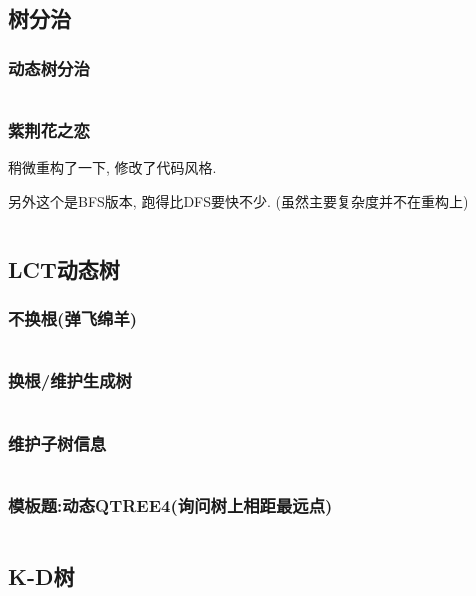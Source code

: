 \documentclass[a4paper, twoside]{article}
\begin{document}
\begin{multicols}{2}
			\subsection{树分治}

				
				\subsubsection{动态树分治}
					\inputminted{cpp}{../src/datastructure/动态树分治.cpp}

				\subsubsection{紫荆花之恋}
					稍微重构了一下, 修改了代码风格.

					另外这个是BFS版本, 跑得比DFS要快不少. (虽然主要复杂度并不在重构上)
					\inputminted{cpp}{../src/datastructure/紫荆花之恋.cpp}
	
			\subsection{LCT动态树}
				\subsubsection{不换根(弹飞绵羊)}
					\inputminted{cpp}{../src/datastructure/LCT(不换根).cpp}
			
				\subsubsection{换根/维护生成树}
					\inputminted{cpp}{../src/datastructure/LCT(换根).cpp}

				\subsubsection{维护子树信息}
					\inputminted{cpp}{../src/datastructure/LCT维护子树信息.cpp}
					
				\subsubsection[模板题:动态QTREE4]{模板题:动态QTREE4(询问树上相距最远点)}
						\inputminted{cpp}{../src/datastructure/动态QTREE4.cpp}
	
			\subsection{K-D树}


\end{multicols}
\end{document}
